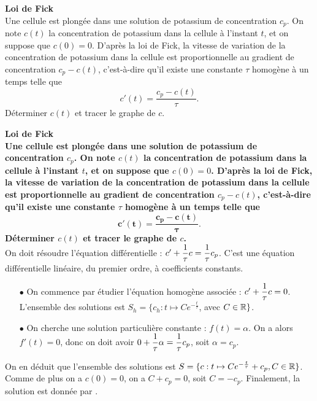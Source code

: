 \documentclass[a4paper, 11pt,reqno]{article}
\begin{document}
\begin{exercice}  \; \textbf{Loi de Fick}\\
  Une cellule est plong\'ee dans une solution de potassium de concentration $c_p$. On note $c(t)$ la concentration de potassium dans la cellule \`a l'instant $t$, et on suppose que $c(0)=0$. D'apr\`es la loi de Fick, la vitesse de variation de la concentration de potassium dans la cellule est proportionnelle au gradient de concentration $c_p-c(t)$, c'est-\`a-dire qu'il existe une constante $\tau$ homog\`ene \`a un temps telle que
  $$c'(t) = \frac{c_p-c(t)}{\tau}.$$
  D\'eterminer $c(t)$ et tracer le graphe de $c$.
\end{exercice}


\begin{correction}  \; \textbf{Loi de Fick}\\
  \textbf{Une cellule est plong\'ee dans une solution de potassium de concentration $c_p$. On note $c(t)$ la concentration de potassium dans la cellule \`a l'instant $t$, et on suppose que $c(0)=0$. D'apr\`es la loi de Fick, la vitesse de variation de la concentration de potassium dans la cellule est proportionnelle au gradient de concentration $c_p-c(t)$, c'est-\`a-dire qu'il existe une constante $\tau$ homog\`ene \`a un temps telle que
    $$\mathbf{c'(t) = \frac{c_p-c(t)}{\tau}.}$$
    D\'eterminer $c(t)$ et tracer le graphe de $c$.}\\
  On doit r\'esoudre l'\'equation diff\'erentielle : $c' +\displaystyle \frac{1}{\tau} c = \frac{1}{\tau} c_p$. C'est une \'equation diff\'erentielle lin\'eaire, du premier ordre, \`a coefficients constants. \\
  \begin{itemize}
    \item[$\bullet$] On commence par \'etudier l'\'equation homog\`ene associ\'ee : $c' +\displaystyle \frac{1}{\tau} c =0$. L'ensemble des solutions est $S_h = \{c_h : t \mapsto C e^{-\frac{t}{\tau}}$, avec $C\in \mathbb{R}\}$.
    \item[$\bullet$] On cherche une solution particuli\`ere constante : $f(t) = \alpha$. On a alors $f'(t) = 0$, donc on doit avoir $0 +\displaystyle \frac{1}{\tau} \alpha = \frac{1}{\tau} c_p$, soit $\alpha = c_p$.
  \end{itemize}
  On en d\'eduit que l'ensemble des solutions est $S=\{c : t\mapsto C e^{-\frac{t}{\tau}} + c_p, C \in \mathbb{R}\}$. Comme de plus on a $c(0) = 0$, on a $C + c_p = 0$, soit $C=-c_p$. Finalement, la solution est donn\'ee par .
  \begin{center}


\end{center}
\end{correction}
\end{document}
